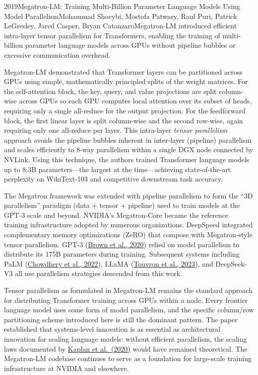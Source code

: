 
\begin{papersummary}{2019}{Megatron-LM: Training Multi-Billion Parameter Language Models Using Model Parallelism}{Mohammad Shoeybi, Mostofa Patwary, Raul Puri, Patrick LeGresley, Jared Casper, Bryan Catanzaro}{Megatron-LM introduced efficient intra-layer tensor parallelism for Transformers, enabling the training of multi-billion parameter language models across GPUs without pipeline bubbles or excessive communication overhead.}

Megatron-LM demonstrated that Transformer layers can be partitioned across GPUs using simple, mathematically principled splits of the weight matrices. For the self-attention block, the key, query, and value projections are split column-wise across GPUs so each GPU computes local attention over its subset of heads, requiring only a single all-reduce for the output projection. For the feedforward block, the first linear layer is split column-wise and the second row-wise, again requiring only one all-reduce per layer. This intra-layer \emph{tensor parallelism} approach avoids the pipeline bubbles inherent in inter-layer (pipeline) parallelism and scales efficiently to 8-way parallelism within a single DGX node connected by NVLink. Using this technique, the authors trained Transformer language models up to 8.3B parameters---the largest at the time---achieving state-of-the-art perplexity on WikiText-103 and competitive downstream task accuracy.

The Megatron framework was extended with pipeline parallelism to form the ``3D parallelism'' paradigm (data + tensor + pipeline) used to train models at the GPT-3 scale and beyond. NVIDIA's Megatron-Core became the reference training infrastructure adopted by numerous organizations. DeepSpeed integrated complementary memory optimizations (ZeRO) that compose with Megatron-style tensor parallelism. GPT-3 (\hyperref[paper:brown-2020]{Brown et al., 2020}) relied on model parallelism to distribute its 175B parameters during training. Subsequent systems including PaLM (\hyperref[paper:chowdhery-2022]{Chowdhery et al., 2022}), LLaMA (\hyperref[paper:touvron-2023-llama]{Touvron et al., 2023}), and DeepSeek-V3 all use parallelism strategies descended from this work.

Tensor parallelism as formulated in Megatron-LM remains the standard approach for distributing Transformer training across GPUs within a node. Every frontier language model uses some form of model parallelism, and the specific column/row partitioning scheme introduced here is still the dominant pattern. The paper established that systems-level innovation is as essential as architectural innovation for scaling language models: without efficient parallelism, the scaling laws documented by \hyperref[paper:kaplan-2020]{Kaplan et al.\ (2020)} would have remained theoretical. The Megatron-LM codebase continues to serve as a foundation for large-scale training infrastructure at NVIDIA and elsewhere.

\end{papersummary}
